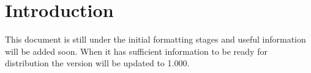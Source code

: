 \chapter{Introduction}
\thispagestyle{fancy}

This document is still under the initial formatting stages and useful information will be added soon. When it has sufficient information to be ready for distribution the version will be updated to 1.000.